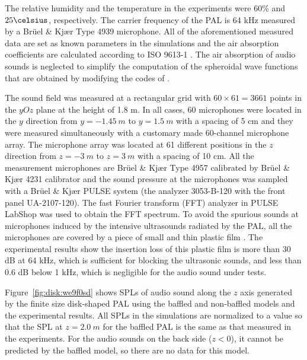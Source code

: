 The relative humidity and the temperature in the experiments were 60\% and $25\celsius$, respectively. 
The carrier frequency of the PAL is 64 kHz measured by a Brüel \& Kjær Type 4939 microphone. 
All of the aforementioned measured data are set as known parameters in the simulations and the air absorption coefficients are calculated according to ISO 9613-1 \cite{1993ISO961311993}. 
The air absorption of audio sounds is neglected to simplify the computation of the spheroidal wave functions that are obtained by modifying the codes of \cite{VanBuren2017AccurateCalculationOblate}.

The sound field was measured at a rectangular grid with $60 \times 61 = 3661$ points in the $yOz$ plane at the height of 1.8 m. 
In all cases, 60 microphones were located in the $y$ direction from $y = \SI{-1.45}{ m}$ to $y = \SI{1.5}{m}$ with a spacing of 5 cm and they were measured simultaneously with a customary made 60-channel microphone array. 
The microphone array was located at 61 different positions in the $z$ direction from $z = \SI{-3 }{m}$ to $z = \SI{3}{m}$ with a spacing of 10 cm. 
All the measurement microphones are Brüel \& Kjær Type 4957 calibrated by Brüel \& Kjær 4231 calibrator and the sound pressure at the microphones was sampled with a Brüel \& Kjær PULSE system (the analyzer 3053-B-120 with the front panel UA-2107-120). 
The fast Fourier transform (FFT) analyzer in PULSE LabShop was used to obtain the FFT spectrum. 
To avoid the spurious sounds at microphones induced by the intensive ultrasounds radiated by the PAL, all the microphones are covered by a piece of small and thin plastic film \cite{Ji2019ExperimentalInvestigationParameters}. 
The experimental results show the insertion loss of this plastic film is more than 30 dB at 64 kHz, which is sufficient for blocking the ultrasonic sounds, and less than 0.6 dB below 1 kHz, which is negligible for the audio sound under tests.

Figure~\ref{fig:disk:we9f0sd} shows SPLs of audio sound along the $z$ axis generated by the finite size disk-shaped PAL using the baffled and non-baffled models and the experimental results. 
All SPLs in the simulations are normalized to a value so that the SPL at $z = \SI{2.0}{m}$ for the baffled PAL is the same as that measured in the experiments. 
For the audio sounds on the back side ($z < 0$), it cannot be predicted by the baffled model, so there are no data for this model. 


